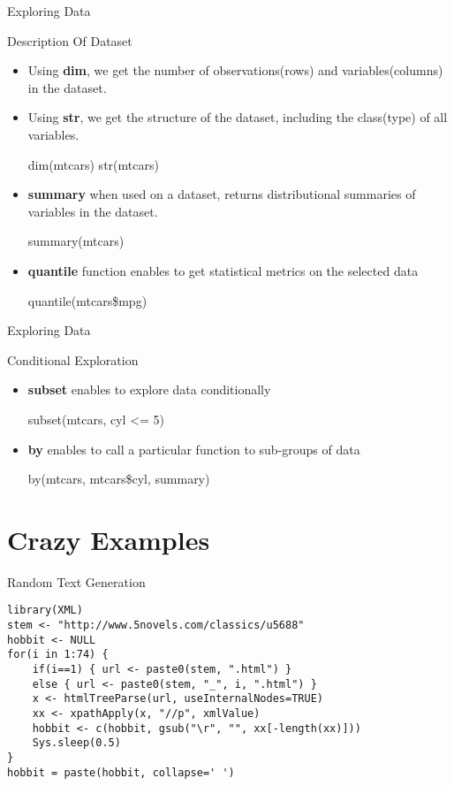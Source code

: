 \begin{frame}{Exploring Data}

\begin{block}{Description Of Dataset}

\begin{itemize}
\item
  Using \textbf{dim}, we get the number of observations(rows) and
  variables(columns) in the dataset.
\item
  Using \textbf{str}, we get the structure of the dataset, including the
  class(type) of all variables.

  dim(mtcars) str(mtcars)
\item
  \textbf{summary} when used on a dataset, returns distributional
  summaries of variables in the dataset.

  summary(mtcars)
\item
  \textbf{quantile} function enables to get statistical metrics on the
  selected data

  quantile(mtcars\$mpg)
\end{itemize}

\end{block}

\end{frame}

\begin{frame}{Exploring Data}

\begin{block}{Conditional Exploration}

\begin{itemize}
\item
  \textbf{subset} enables to explore data conditionally

  subset(mtcars, cyl \textless{}= 5)
\item
  \textbf{by} enables to call a particular function to sub-groups of
  data

  by(mtcars, mtcars\$cyl, summary)
\end{itemize}

\end{block}

\end{frame}

\section{Crazy Examples}\label{crazy-examples}

\begin{frame}[fragile]{Random Text Generation}

\begin{verbatim}
library(XML)
stem <- "http://www.5novels.com/classics/u5688"
hobbit <- NULL
for(i in 1:74) {
    if(i==1) { url <- paste0(stem, ".html") } 
    else { url <- paste0(stem, "_", i, ".html") }
    x <- htmlTreeParse(url, useInternalNodes=TRUE)
    xx <- xpathApply(x, "//p", xmlValue)
    hobbit <- c(hobbit, gsub("\r", "", xx[-length(xx)]))
    Sys.sleep(0.5)
}
hobbit = paste(hobbit, collapse=' ')
\end{verbatim}

\end{frame}

